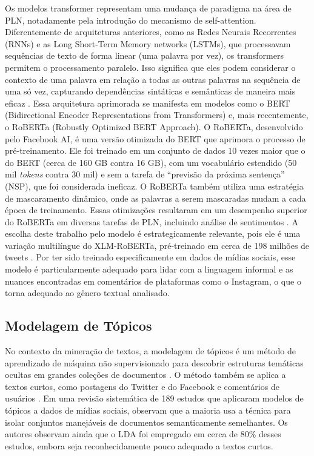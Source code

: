 Os modelos transformer representam uma mudança de paradigma na área de PLN, notadamente pela introdução do mecanismo de self-attention. Diferentemente de arquiteturas anteriores, como as Redes Neurais Recorrentes (RNNs) e as Long Short-Term Memory networks (LSTMs), que processavam sequências de texto de forma linear (uma palavra por vez), os transformers permitem o processamento paralelo. Isso significa que eles podem considerar o contexto de uma palavra em relação a todas as outras palavras na sequência de uma só vez, capturando dependências sintáticas e semânticas de maneira mais eficaz \cite{vaswani2017}. Essa arquitetura aprimorada se manifesta em modelos como o BERT (Bidirectional Encoder Representations from Transformers) e, mais recentemente, o RoBERTa (Robustly Optimized BERT Approach). O RoBERTa, desenvolvido pelo Facebook AI, é uma versão otimizada do BERT que aprimora o processo de pré-treinamento. Ele foi treinado em um conjunto de dados 10 vezes maior que o do BERT (cerca de 160 GB contra 16 GB), com um vocabulário estendido (50 mil \emph{tokens} contra 30 mil) e sem a tarefa de ``previsão da próxima sentença'' (NSP), que foi considerada ineficaz. O RoBERTa também utiliza uma estratégia de mascaramento dinâmico, onde as palavras a serem mascaradas mudam a cada época de treinamento. Essas otimizações resultaram em um desempenho superior do RoBERTa em diversas tarefas de PLN, incluindo análise de sentimentos \cite{liu2019roberta}. A escolha deste trabalho pelo modelo  é estrategicamente relevante, pois ele é uma variação multilíngue do XLM-RoBERTa, pré-treinado em cerca de 198 milhões de tweets \cite{barbieri2022xlmt}. Por ter sido treinado especificamente em dados de mídias sociais, esse modelo é particularmente adequado para lidar com a linguagem informal e as nuances encontradas em comentários de plataformas como o Instagram, o que o torna adequado ao gênero textual analisado.

\subsection{Modelagem de Tópicos}

No contexto da mineração de textos, a modelagem de tópicos é um método de aprendizado de máquina não supervisionado para descobrir estruturas temáticas ocultas em grandes coleções de documentos \cite{albalawi2020}. O método também se aplica a textos curtos, como postagens do Twitter e do Facebook e comentários de usuários \cite{albalawi2020}. Em uma revisão sistemática de 189 estudos que aplicaram modelos de tópicos a dados de mídias sociais,  observam que a maioria usa a técnica para isolar conjuntos manejáveis de documentos semanticamente semelhantes. Os autores observam ainda que o LDA foi empregado em cerca de 80\% desses estudos, embora seja reconhecidamente pouco adequado a textos curtos.

